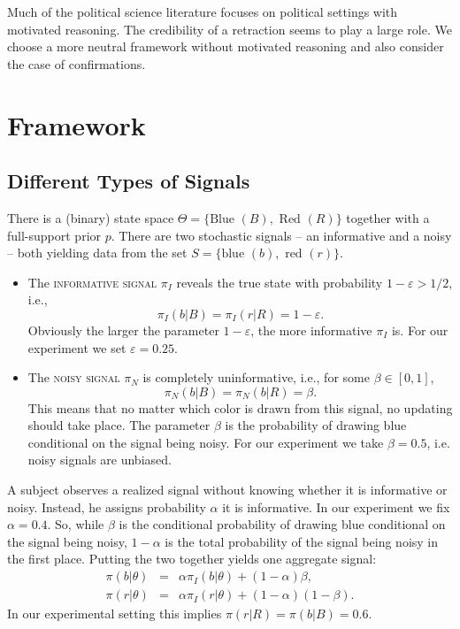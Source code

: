 \documentclass{article}
\begin{document}
Much of the political science literature focuses on political settings with motivated reasoning. The credibility of a retraction seems to play a large role. We choose a more neutral framework without motivated reasoning and also consider the case of confirmations.


\section{Framework}

\subsection{Different Types of Signals}

There is a (binary) state space $\Theta=\{\text{Blue }(B), \text{ Red }(R)\}$ together with a full-support prior $p$. There are two stochastic signals -- an informative and a noisy -- both yielding data from the set $S=\{\text{blue }(b), \text{ red }(r)\}$. 

\begin{itemize}

\item The \textsc{informative signal} $\pi_I$ reveals the true state with probability $1-\varepsilon>1/2$, i.e., 
$$\pi_I(b|B)=\pi_I(r|R)=1-\varepsilon.$$ 
Obviously the larger the parameter $1-\varepsilon$, the more informative $\pi_I$ is. For our experiment we set $\varepsilon=0.25$.

\item The \textsc{noisy signal} $\pi_N$ is completely uninformative, i.e., for some $\beta\in[0,1]$,
$$\pi_N(b|B)=\pi_N(b|R)=\beta.$$ 
This means that no matter which color is drawn from this signal, no updating should take place. The parameter $\beta$ is the probability of drawing blue conditional on the signal being noisy. For our experiment we take $\beta=0.5$, i.e. noisy signals are unbiased.

\end{itemize}

A subject observes a realized signal without knowing whether it is informative or noisy. Instead, he assigns probability $\alpha$ it is informative. In our experiment we fix $\alpha=0.4$. So, while $\beta$ is the conditional probability of drawing blue conditional on the signal being noisy, $1-\alpha$ is the total probability of the signal being noisy in the first place. Putting the two together yields one aggregate signal:
\begin{eqnarray*}
\pi(b|\theta)&=&\alpha\pi_I(b|\theta)+(1-\alpha)\beta, \\
\pi(r|\theta)&=&\alpha\pi_I(r|\theta)+(1-\alpha)(1-\beta). 
\end{eqnarray*}
In our experimental setting this implies $\pi(r|R) = \pi(b|B) = 0.6$.
\end{document}
